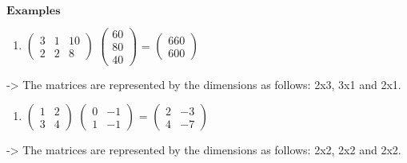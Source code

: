 \documentclass[]{article}
\providecommand{\tightlist}{%
  \setlength{\itemsep}{0pt}\setlength{\parskip}{0pt}}
\begin{document}
~

\(\mathbf{Examples}\)\\

\begin{enumerate}
\def\labelenumi{\alph{enumi})}
\tightlist
\item
  \(\begin{pmatrix} 3 & 1 & 10 \\ 2 & 2 & 8 \end{pmatrix}\)
  \(\begin{pmatrix} 60 \\ 80 \\ 40 \end{pmatrix}\) =
  \(\begin{pmatrix} 660 \\ 600 \end{pmatrix}\)\\
\end{enumerate}

-\textgreater{} The matrices are represented by the dimensions as
follows: 2x3, 3x1 and 2x1.\\

\begin{enumerate}
\def\labelenumi{\alph{enumi})}
\setcounter{enumi}{1}
\tightlist
\item
  \(\begin{pmatrix} 1 & 2 \\ 3 & 4 \end{pmatrix}\)
  \(\begin{pmatrix} 0 & -1 \\ 1 & -1 \end{pmatrix}\) =
  \(\begin{pmatrix} 2 & -3 \\ 4 & -7 \end{pmatrix}\)\\
\end{enumerate}

-\textgreater{} The matrices are represented by the dimensions as
follows: 2x2, 2x2 and 2x2.\\
\end{document}
